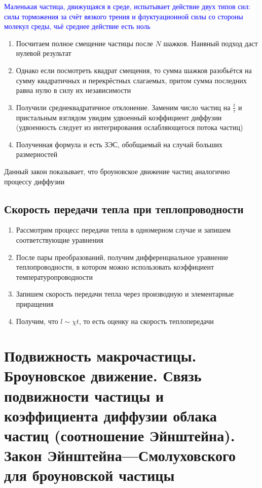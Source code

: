 \documentclass[a4paper, 14pt]{article}
\begin{document}
    \textcolor{blue}{Маленькая частица, движущаяся в среде, испытывает действие двух типов сил: силы торможения за
    счёт вязкого трения и флуктуационной силы со стороны молекул среды, чьё среднее действие есть ноль}
    
    \begin{enumerate}
        \item Посчитаем полное смещение частицы после $N$ шажков.
        Наивный подход даст нулевой результат
        \item Однако если посмотреть квадрат смещения, то сумма шажков разобьётся на сумму квадратичных и
        перекрёстных слагаемых, притом сумма последних равна нулю в силу их независимости
        \item Получили среднеквадратичное отклонение.
        Заменим число частиц на $\frac{t}{\tau}$ и пристальным взглядом увидим удвоенный коэффициент диффузии
        (удвоенность следует из интегрирования ослабляющегося потока частиц)
        \item Полученная формула и есть ЗЭС, обобщаемый на случай больших размерностей
    \end{enumerate}
    
    Данный закон показывает, что броуновское движение частиц аналогично процессу диффузии
    
    \subsection{Скорость передачи тепла при теплопроводности}
    
    \begin{enumerate}
        \item Рассмотрим процесс передачи тепла в одномерном случае и запишем соответствующие уравнения
        \item После пары преобразований, получим дифференциальное уравнение теплопроводности, в котором можно
        использовать коэффициент температуропроводности
        \item Запишем скорость передачи тепла через производную и элементарные приращения
        \item Получим, что $l \sim \chi t$, то есть оценку на скорость теплопередачи
    \end{enumerate}
    
    \section{Подвижность макрочастицы.
    Броуновское движение.
    Связь подвижности частицы и коэффициента диффузии облака частиц (соотношение Эйнштейна).
    Закон Эйнштейна—Смолуховского для броуновской частицы}
    
\end{document}
